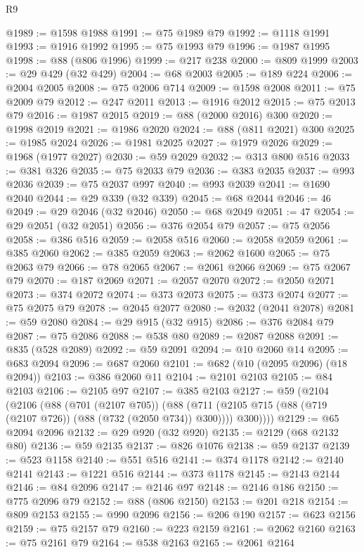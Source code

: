 \begin{lexlean}{R9}
\begin{coremodule}
@1989 := @1598 @1988
@1991 := @75 @1989 @79
@1992 := @1118 @1991
@1993 := @1916 @1992
@1995 := @75 @1993 @79
@1996 := @1987 @1995
@1998 := @88 (@806 @1996)
@1999 := @217 @238
@2000 := @809 @1999
@2003 := @29 @429 (@32 @429)
@2004 := @68 @2003
@2005 := @189 @224
@2006 := @2004 @2005
@2008 := @75 @2006 @714
@2009 := @1598 @2008
@2011 := @75 @2009 @79
@2012 := @247 @2011
@2013 := @1916 @2012
@2015 := @75 @2013 @79
@2016 := @1987 @2015
@2019 := @88 (@2000 @2016) @300
@2020 := @1998 @2019
@2021 := @1986 @2020
@2024 := @88 (@811 @2021) @300
@2025 := @1985 @2024
@2026 := @1981 @2025
@2027 := @1979 @2026
@2029 := @1968 (@1977 @2027)
@2030 := @59 @2029
@2032 := @313 @800 @516
@2033 := @381 @326
@2035 := @75 @2033 @79
@2036 := @383 @2035
@2037 := @993 @2036
@2039 := @75 @2037 @997
@2040 := @993 @2039
@2041 := @1690 @2040
@2044 := @29 @339 (@32 @339)
@2045 := @68 @2044
@2046 := 46
@2049 := @29 @2046 (@32 @2046)
@2050 := @68 @2049
@2051 := 47
@2054 := @29 @2051 (@32 @2051)
@2056 := @376 @2054 @79
@2057 := @75 @2056
@2058 := @386 @516
@2059 := @2058 @516
@2060 := @2058 @2059
@2061 := @385 @2060
@2062 := @385 @2059
@2063 := @2062 @1600
@2065 := @75 @2063 @79
@2066 := @78 @2065
@2067 := @2061 @2066
@2069 := @75 @2067 @79
@2070 := @187 @2069
@2071 := @2057 @2070
@2072 := @2050 @2071
@2073 := @374 @2072
@2074 := @373 @2073
@2075 := @373 @2074
@2077 := @75 @2075 @79
@2078 := @2045 @2077
@2080 := @2032 (@2041 @2078)
@2081 := @59 @2080
@2084 := @29 @915 (@32 @915)
@2086 := @376 @2084 @79
@2087 := @75 @2086
@2088 := @538 @80
@2089 := @2087 @2088
@2091 := @835 (@528 @2089)
@2092 := @59 @2091
@2094 := @10 @2060 @14
@2095 := @683 @2094
@2096 := @687 @2060
@2101 := @682 (@10 (@2095 @2096) (@18 @2094))
@2103 := @386 @2060 @11
@2104 := @2101 @2103
@2105 := @84 @2103
@2106 := @2105 @97
@2107 := @385 @2103
@2127 := @59
    (@2104
      (@2106
        (@88
          (@701 (@2107 @705))
          (@88 (@711 (@2105 @715 (@88 (@719 (@2107 @726)) (@88 (@732 (@2050 @734)) @300)))) @300))))
@2129 := @65 @2094 @2096
@2132 := @29 @920 (@32 @920)
@2135 := @2129 (@68 @2132 @80)
@2136 := @59 @2135
@2137 := @826 @1076
@2138 := @59 @2137
@2139 := @523 @1158
@2140 := @551 @516
@2141 := @374 @1178
@2142 := @2140 @2141
@2143 := @1221 @516
@2144 := @373 @1178
@2145 := @2143 @2144
@2146 := @84 @2096
@2147 := @2146 @97
@2148 := @2146 @186
@2150 := @775 @2096 @79
@2152 := @88 (@806 @2150)
@2153 := @201 @218
@2154 := @809 @2153
@2155 := @990 @2096
@2156 := @206 @190
@2157 := @623 @2156
@2159 := @75 @2157 @79
@2160 := @223 @2159
@2161 := @2062 @2160
@2163 := @75 @2161 @79
@2164 := @538 @2163
@2165 := @2061 @2164

\end{coremodule}
\end{lexlean}
